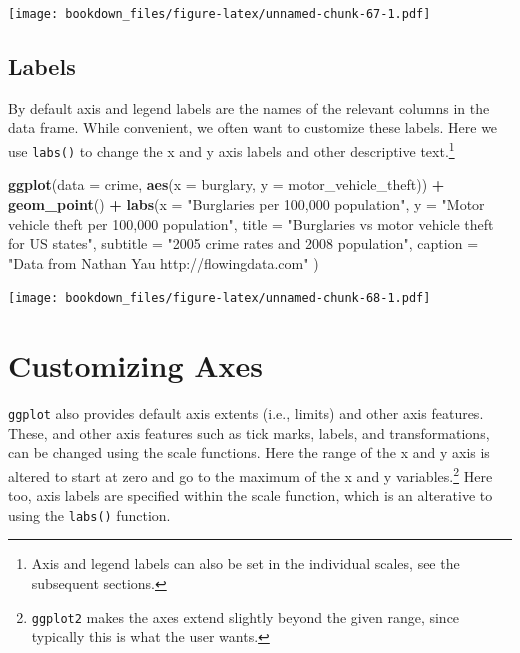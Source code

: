 \documentclass[
]{krantz}
\makeatletter
\newenvironment{Shaded}{\begin{snugshade}}{\end{snugshade}}
\newcommand{\DataTypeTok}[1]{\textcolor[rgb]{0.27,0.27,0.27}{#1}}
\newcommand{\KeywordTok}[1]{\textcolor[rgb]{0.27,0.27,0.27}{\textbf{#1}}}
\newcommand{\NormalTok}[1]{#1}
\newcommand{\OperatorTok}[1]{\textcolor[rgb]{0.43,0.43,0.43}{\textbf{#1}}}
\newcommand{\StringTok}[1]{\textcolor[rgb]{0.5,0.5,0.5}{#1}}
\newenvironment{kframe}{%
\medskip{}
\setlength{\fboxsep}{.8em}
 \def\at@end@of@kframe{}%
 \ifinner\ifhmode%
  \def\at@end@of@kframe{\end{minipage}}%
  \begin{minipage}{\columnwidth}%
 \fi\fi%
 \def\FrameCommand##1{\hskip\@totalleftmargin \hskip-\fboxsep
 \colorbox{shadecolor}{##1}\hskip-\fboxsep
     \hskip-\linewidth \hskip-\@totalleftmargin \hskip\columnwidth}%
 \MakeFramed {\advance\hsize-\width
   \@totalleftmargin\z@ \linewidth\hsize
   \@setminipage}}%
 {\par\unskip\endMakeFramed%
 \at@end@of@kframe}
\renewenvironment{Shaded}{\begin{kframe}}{\end{kframe}}
\makeatother
\begin{document}
\texttt{[image: bookdown\_files/figure-latex/unnamed-chunk-67-1.pdf]}

\hypertarget{labels}{%
\subsection{Labels}\label{labels}}

By default axis and legend labels are the names of the relevant columns in the data frame. While convenient, we often want to customize these labels. Here we use \texttt{labs()} to change the x and y axis labels and other descriptive text.\footnote{Axis and legend labels can also be set in the individual scales, see the subsequent sections.}

\begin{Shaded}
\begin{Highlighting}[]
\KeywordTok{ggplot}\NormalTok{(}\DataTypeTok{data =}\NormalTok{ crime, }\KeywordTok{aes}\NormalTok{(}\DataTypeTok{x =}\NormalTok{ burglary, }\DataTypeTok{y =}\NormalTok{ motor\_vehicle\_theft)) }\OperatorTok{+}\StringTok{ }
\StringTok{    }\KeywordTok{geom\_point}\NormalTok{() }\OperatorTok{+}\StringTok{ }
\StringTok{    }\KeywordTok{labs}\NormalTok{(}\DataTypeTok{x =} \StringTok{"Burglaries per 100,000 population"}\NormalTok{, }
         \DataTypeTok{y =} \StringTok{"Motor vehicle theft per 100,000 population"}\NormalTok{,}
         \DataTypeTok{title =} \StringTok{"Burglaries vs motor vehicle theft for US states"}\NormalTok{,}
         \DataTypeTok{subtitle =} \StringTok{"2005 crime rates and 2008 population"}\NormalTok{,}
         \DataTypeTok{caption =} \StringTok{"Data from Nathan Yau http://flowingdata.com"}
\NormalTok{         )}
\end{Highlighting}
\end{Shaded}

\texttt{[image: bookdown\_files/figure-latex/unnamed-chunk-68-1.pdf]}

\hypertarget{customizing-axes}{%
\section{Customizing Axes}\label{customizing-axes}}

\texttt{ggplot} also provides default axis extents (i.e., limits) and other axis features. These, and other axis features such as tick marks, labels, and transformations, can be changed using the scale functions. Here the range of the x and y axis is altered to start at zero and go to the maximum of the x and y variables.\footnote{\texttt{ggplot2} makes the axes extend slightly beyond the given range, since typically this is what the user wants.} Here too, axis labels are specified within the scale function, which is an alterative to using the \texttt{labs()} function.
\end{document}
